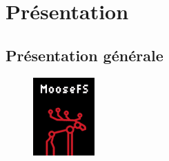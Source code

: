 \documentclass[12pt]{report}
\begin{document}
		\section{Présentation}

			\subsection{Présentation générale}
				\begin{figure}[H]
					\begin{center}
						\includegraphics[width=0.15\linewidth]{images/moosefs.png}
					\end{center}
				\end{figure}
		
				
\end{document}
